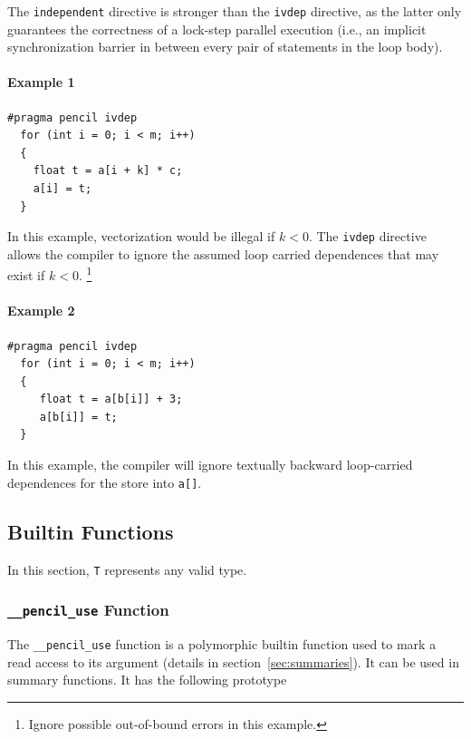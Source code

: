  The \lstinline!independent!  directive is stronger than the
  \lstinline!ivdep! directive, as the latter only guarantees the
  correctness of a lock-step parallel execution (i.e., an implicit
  synchronization barrier in between every pair of statements in the loop
  body).
  
  \paragraph{Example 1}

  \begin{lstlisting}[language=pencil]
  #pragma pencil ivdep
  for (int i = 0; i < m; i++)
  {
    float t = a[i + k] * c;
    a[i] = t;
  }
  \end{lstlisting}
  In this example, vectorization would be illegal if $k < 0$.  The
  \lstinline!ivdep! directive allows the compiler to ignore the assumed
  loop carried dependences that may exist if $k < 0$. \footnote{Ignore
  possible out-of-bound errors in this example.}
  
  \paragraph{Example 2}
  
  \begin{lstlisting}[language=pencil]
  #pragma pencil ivdep
  for (int i = 0; i < m; i++)
  {
     float t = a[b[i]] + 3;
     a[b[i]] = t;
  }
  \end{lstlisting}
  In this example, the compiler will ignore textually backward
  loop-carried dependences for the store into \lstinline!a[]!.


\subsection{\label{sec:builtins}Builtin Functions}

In this section, \lstinline!T! represents any valid \pencil type.

\subsubsection{\texttt{\_\_pencil\_use} Function}

  The \lstinline!__pencil_use! function is
  a polymorphic builtin function used to mark a read access to
  its argument
  (details in section~\ref{sec:summaries}).
  It can be used in summary functions.
  It has the following prototype
  
